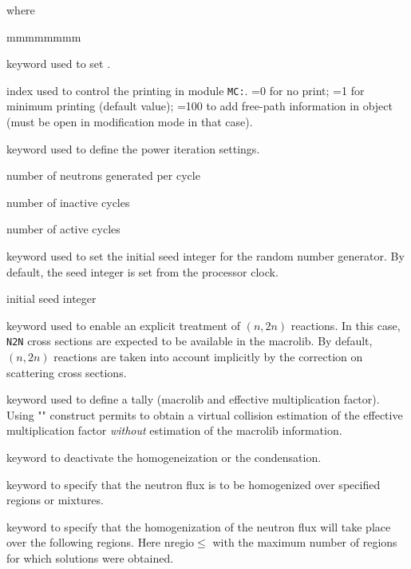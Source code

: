 \noindent where
\begin{ListeDeDescription}{mmmmmmmm}

\item[\moc{EDIT}] keyword used to set .

\item[\dusa{iprint}] index used to control the printing in module {\tt MC:}. =0 for no print; =1 for minimum printing (default value);
=100 to add free-path information in object  (must be open in modification mode in that case).

\item[\moc{KCODE}] keyword used to define the power iteration settings.

\item[\dusa{nsrck}] number of neutrons generated per cycle

\item[\dusa{ikz}] number of inactive cycles

\item[\dusa{kct}] number of active cycles

\item[\moc{SEED}] keyword used to set the initial seed integer for the random number generator. By default, the seed integer is set from
the processor clock.

\item[\dusa{iseed}] initial seed integer

\item[\moc{N2N}] keyword used to enable an explicit treatment of $(n,2n)$ reactions. In this case, {\tt N2N} cross sections are
expected to be available in the macrolib. By default, $(n,2n)$ reactions are taken into account implicitly by the correction on scattering
cross sections.

\item[\moc{TALLY}] keyword used to define a tally (macrolib and effective multiplication factor). Using "" construct
permits to obtain a virtual collision estimation of the effective multiplication factor {\sl without} estimation of the macrolib
information.

\item[\moc{NONE}] keyword to deactivate the homogeneization or the condensation. 

\item[\moc{MERG}] keyword to specify that the neutron flux is to be
homogenized over specified regions or mixtures. 

\item[\moc{REGI}] keyword to specify that the homogenization of the neutron
flux will take place over the following regions. Here nregio$\le$
with  the maximum number of regions for which solutions were
obtained.


\end{ListeDeDescription}
